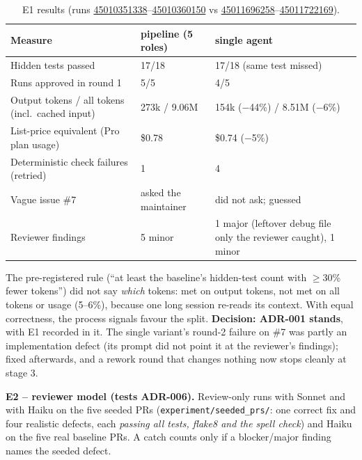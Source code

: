 \documentclass[10pt,a4paper]{article}
\newcommand{\run}[1]{\href{https://github.com/MittalManas2005/markdown/actions/runs/#1}{#1}}
\newcommand{\adr}[1]{ADR-#1}
\begin{document}
\begin{table}[h]
\centering\footnotesize
\begin{tabularx}{\linewidth}{@{}Y l l@{}}
\toprule
Measure & pipeline (5 roles) & single agent\\
\midrule
Hidden tests passed & 17/18 & 17/18 (same test missed)\\
Runs approved in round 1 & 5/5 & 4/5\\
Output tokens / all tokens (incl.\ cached input) & 273k / 9.06M & 154k ($-$44\%) / 8.51M ($-$6\%)\\
List-price equivalent (Pro plan usage) & \$0.78 & \$0.74 ($-$5\%)\\
Deterministic check failures (retried) & 1 & 4\\
Vague issue \#7 & asked the maintainer & did not ask; guessed\\
Reviewer findings & 5 minor & 1 major (leftover debug file only the reviewer caught), 1 minor\\
\bottomrule
\end{tabularx}
\caption{E1 results (runs \run{45010351338}--\run{45010360150} vs \run{45011696258}--\run{45011722169}).}
\end{table}

The pre-registered rule (``at least the baseline's hidden-test count with $\ge$30\% fewer tokens'') did not say
\emph{which} tokens: met on output tokens, not met on all tokens or usage (5--6\%), because one long session re-reads its
context. With equal correctness, the process signals favour the split. \textbf{Decision: \adr{001} stands}, with E1
recorded in it. The single variant's round-2 failure on \#7 was partly an implementation defect (its prompt did not point
it at the reviewer's findings); fixed afterwards, and a rework round that changes nothing now stops cleanly at stage 3.

\textbf{E2 -- reviewer model (tests \adr{006}).} Review-only runs with Sonnet and with Haiku on the five seeded PRs
(\texttt{experiment/seeded\_prs/}: one correct fix and four realistic defects, each \emph{passing all tests, flake8 and the
spell check}) and Haiku on the five real baseline PRs. A catch counts only if a blocker/major finding names the seeded defect.
\end{document}
